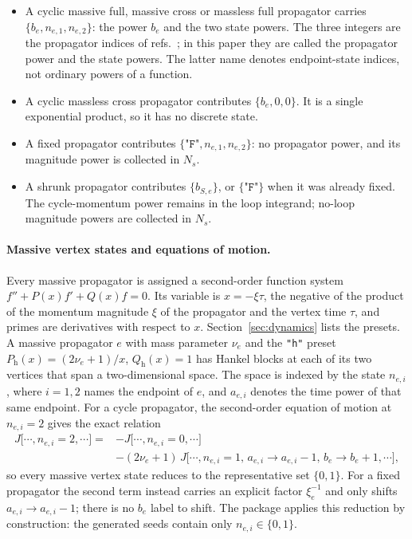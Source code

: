 \documentclass[11pt,a4paper]{article}
\begin{document}
\begin{itemize}
\item A cyclic massive full, massive cross or massless full propagator carries
$\{b_e,n_{e,1},n_{e,2}\}$: the power $b_e$ and the two state powers. The three integers are the
propagator indices of refs.~\cite{Chen:2023iix,Chen:2024glu,Chen:2026dqp}; in this paper they are
called the propagator power and the state powers. The latter name denotes endpoint-state
indices, not ordinary powers of a function.
\item A cyclic massless cross propagator contributes $\{b_e,0,0\}$. It is a single exponential
product, so it has no discrete state.
\item A fixed propagator contributes $\{\texttt{"F"},n_{e,1},n_{e,2}\}$: no propagator power, and
its magnitude power is collected in $N_s$.
\item A shrunk propagator contributes $\{b_{S,e}\}$, or $\{\texttt{"F"}\}$ when it was already
fixed. The cycle-momentum power remains in the loop integrand; no-loop magnitude powers are
collected in $N_s$.
\end{itemize}

\paragraph{Massive vertex states and equations of motion.}
Every massive propagator is assigned a second-order function system
$f''+P(x)f'+Q(x)f=0$. Its variable is $x=-\xi\tau$, the negative of the product of the momentum
magnitude $\xi$ of the propagator and the vertex time $\tau$, and primes are derivatives with respect to
$x$. Section~\ref{sec:dynamics} lists the presets. A massive propagator $e$ with mass parameter
$\nu_e$
and the \texttt{"h"} preset $P_{\mathrm h}(x)=(2\nu_e+1)/x$,
$Q_{\mathrm h}(x)=1$ has Hankel blocks at each of its two vertices that span a two-dimensional space.
The space is
indexed by the state $n_{e,i}$, where $i=1,2$ names the endpoint of $e$, and $a_{e,i}$ denotes the
time power of that same endpoint. For a cycle propagator, the second-order equation of motion
at $n_{e,i}=2$ gives the exact relation
\begin{equation}
\begin{split}
J\big[\cdots,n_{e,i}=2,\cdots\big]
={}&-J\big[\cdots,n_{e,i}=0,\cdots\big]\\
&-(2\nu_e+1)\,J\big[\cdots,n_{e,i}=1,\,a_{e,i}\!\to\!a_{e,i}\!-\!1,\,b_e\!\to\!b_e\!+\!1,\cdots\big],
\end{split}
\label{eq:eom}
\end{equation}
so every massive vertex state reduces to the representative set $\{0,1\}$. For a fixed
propagator the second term instead carries an explicit factor $\xi_e^{-1}$ and only shifts
$a_{e,i}\to a_{e,i}-1$; there is no $b_e$ label to shift.
The package applies this reduction by construction: the generated seeds contain only
$n_{e,i}\in\{0,1\}$.
\end{document}
